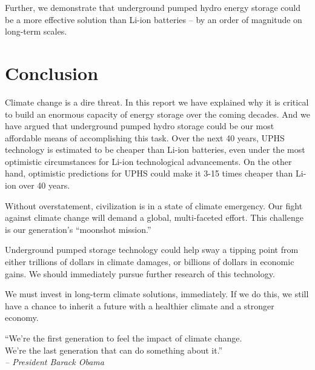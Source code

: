 \documentclass[hidelinks,12pt,a4paper]{article}
\begin{document}
Further, we demonstrate that underground pumped hydro energy storage could be a more effective solution than Li-ion batteries -- by an order of magnitude on long-term scales.

\pagebreak[4]
\section{Conclusion}
Climate change is a dire threat. In this report we have explained why it is critical to build an enormous capacity of energy storage over the coming decades. And we have argued that underground pumped hydro storage could be our most affordable means of accomplishing this task. Over the next 40 years, UPHS technology is estimated to be cheaper than Li-ion batteries, even under the most optimistic circumstances for Li-ion technological advancements. On the other hand, optimistic predictions for UPHS could make it 3-15 times cheaper than Li-ion over 40 years.

Without overstatement, civilization is in a state of climate emergency. Our fight against climate change will demand a global, multi-faceted effort. This challenge is our generation's “moonshot mission.”

Underground pumped storage technology could help sway a tipping point from either trillions of dollars in climate damages, or billions of dollars in economic gains. We should immediately pursue further research of this technology.

We must invest in long-term climate solutions, immediately. If we do this, we still have a chance to inherit a future with a healthier climate and a stronger economy.

\begin{displayquote}
“We’re the first generation to feel the impact of climate change. \\  We’re the last generation that can do something about it.” \cite{ObamaIssuesChallengeOnClimateChangeWithPowerPlantRule} \\ \textit{-- President Barack Obama}
\end{displayquote}


\pagebreak[4]
{\footnotesize


}

\end{document}

